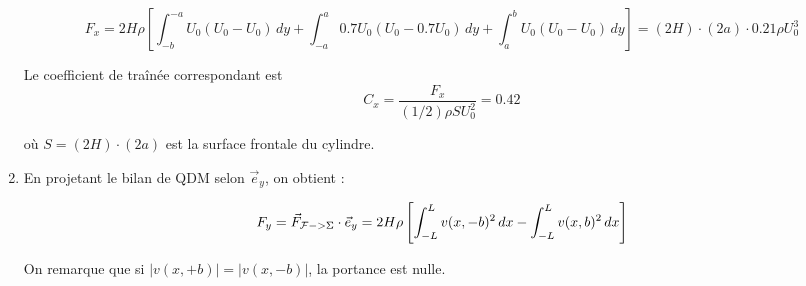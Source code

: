\documentclass[10pt, a4paper]{article}
\begin{document}
\begin{enumerate}
$$
F_x 
= 2 H \rho \left[ \int_{-b}^{-a}  U_0 ( U_0- U_0 )  \, d y +\int_{-a}^{a}  0.7 U_0 ( U_0- 0.7 U_0 )\, dy  +\int_{a}^{b}  U_0 ( U_0- U_0 ) \, dy \right]
= (2 H) \cdot ( 2 a) \cdot 0.21 \rho U_0^3  
$$

Le coefficient de traînée correspondant est 
$$
C_x = \frac{F_x}{(1/2) \rho S U_0^2} = 0.42
$$

où $S = (2 H) \cdot (2a) $ est la surface frontale du cylindre.

\item
En projetant le bilan de QDM selon $\vec e_y$, on obtient :

\begin{equation}
F_y = \vec F_{{\cal F} -> \Sigma}  \cdot \vec  e_y 
= 2 H \rho   \left[ \int_{-L}^L v(x,-b)^2 \, dx - \int_{-L}^{L} v(x,b)^2 \, dx  \right]
 \end{equation}

On remarque que si $|v(x,+b)| = |v(x,-b)|$, la portance est nulle.



\end{enumerate}
\end{document}
